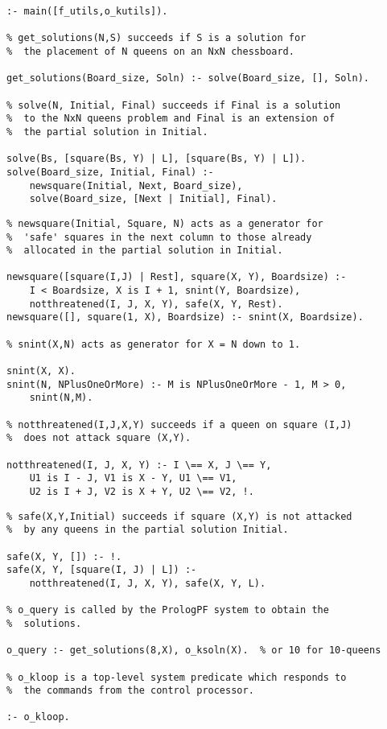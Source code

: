 \begin{verbatim}
:- main([f_utils,o_kutils]).

% get_solutions(N,S) succeeds if S is a solution for
%  the placement of N queens on an NxN chessboard.

get_solutions(Board_size, Soln) :- solve(Board_size, [], Soln). 

% solve(N, Initial, Final) succeeds if Final is a solution
%  to the NxN queens problem and Final is an extension of
%  the partial solution in Initial.

solve(Bs, [square(Bs, Y) | L], [square(Bs, Y) | L]).
solve(Board_size, Initial, Final) :-
    newsquare(Initial, Next, Board_size),
    solve(Board_size, [Next | Initial], Final).
\end{verbatim}      %
\pagebreak          %
\begin{verbatim}
% newsquare(Initial, Square, N) acts as a generator for
%  'safe' squares in the next column to those already
%  allocated in the partial solution in Initial.

newsquare([square(I,J) | Rest], square(X, Y), Boardsize) :-
    I < Boardsize, X is I + 1, snint(Y, Boardsize),
    notthreatened(I, J, X, Y), safe(X, Y, Rest).
newsquare([], square(1, X), Boardsize) :- snint(X, Boardsize).

% snint(X,N) acts as generator for X = N down to 1.

snint(X, X).
snint(N, NPlusOneOrMore) :- M is NPlusOneOrMore - 1, M > 0,
    snint(N,M).

% notthreatened(I,J,X,Y) succeeds if a queen on square (I,J)
%  does not attack square (X,Y).

notthreatened(I, J, X, Y) :- I \== X, J \== Y, 
    U1 is I - J, V1 is X - Y, U1 \== V1,
    U2 is I + J, V2 is X + Y, U2 \== V2, !.

\end{verbatim}      %
\pagebreak          %
\begin{verbatim}
% safe(X,Y,Initial) succeeds if square (X,Y) is not attacked
%  by any queens in the partial solution Initial.

safe(X, Y, []) :- !.
safe(X, Y, [square(I, J) | L]) :-
    notthreatened(I, J, X, Y), safe(X, Y, L).

% o_query is called by the PrologPF system to obtain the
%  solutions.

o_query :- get_solutions(8,X), o_ksoln(X).  % or 10 for 10-queens

% o_kloop is a top-level system predicate which responds to
%  the commands from the control processor.

:- o_kloop.
\end{verbatim}

